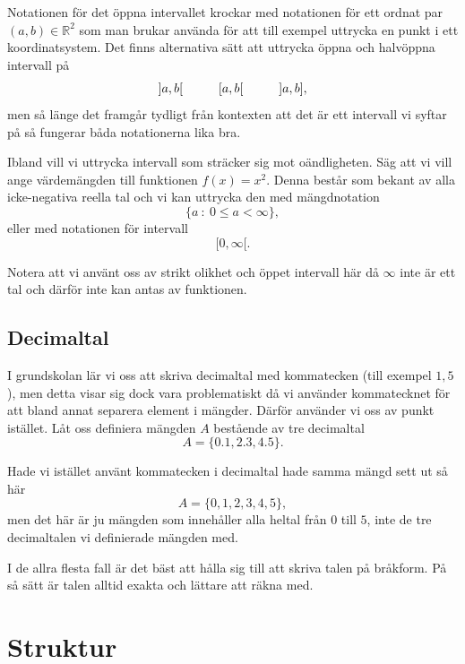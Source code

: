 \documentclass[titlepage]{article}
\begin{document}
Notationen för det öppna intervallet krockar med notationen för ett ordnat par $(a,b) \in \mathbb{R}^2$ som man brukar använda för att till exempel uttrycka en punkt i ett koordinatsystem. Det finns alternativa sätt att uttrycka öppna och halvöppna intervall på
$$]a,b[ \hspace{10mm} [a,b[ \hspace{10mm} ]a,b],$$
men så länge det framgår tydligt från kontexten att det är ett intervall vi syftar på så fungerar båda notationerna lika bra.

Ibland vill vi uttrycka intervall som sträcker sig mot oändligheten. Säg att vi vill ange värdemängden till funktionen $f(x) = x^2$. Denna består som bekant av alla icke-negativa reella tal och vi kan uttrycka den med mängdnotation
$$\{ a \: : \: 0 \leq a < \infty \},$$
eller med notationen för intervall
$$[0, \infty[.$$

Notera att vi använt oss av strikt olikhet och öppet intervall här då $\infty$ inte är ett tal och därför inte kan antas av funktionen.




\subsection{Decimaltal}

I grundskolan lär vi oss att skriva decimaltal med kommatecken (till exempel $1,5$), men detta visar sig dock vara problematiskt då vi använder kommatecknet för att bland annat separera element i mängder. Därför använder vi oss av punkt istället. Låt oss definiera mängden $A$ bestående av tre decimaltal
$$A = \{0.1,2.3,4.5\}.$$

Hade vi istället använt kommatecken i decimaltal hade samma mängd sett ut så här
$$A = \{0,1,2,3,4,5\},$$
men det här är ju mängden som innehåller alla heltal från $0$ till $5$, inte de tre decimaltalen vi definierade mängden med.

I de allra flesta fall är det bäst att hålla sig till att skriva talen på bråkform. På så sätt är talen alltid exakta och lättare att räkna med.




\section{Struktur}
\end{document}
